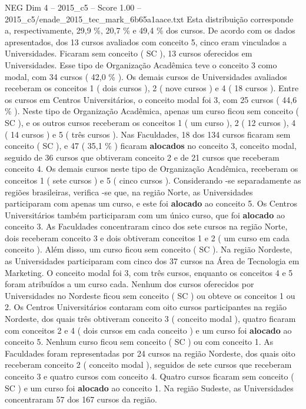 \begin{textsample}{NEG Dim 4 – 2015\_c5 – Score 1.00 – 2015\_c5/enade\_2015\_tec\_mark\_6b65a1aace.txt}
Esta distribuição corresponde a, respectivamente, 29,9 \%, 20,7 \% e 49,4 \% dos cursos.
De acordo com os dados apresentados, dos 13 cursos avaliados com conceito 5, cinco eram vinculados a Universidades.
Ficaram sem conceito ( SC ), 13 cursos oferecidos em Universidades.
Esse tipo de Organização Acadêmica teve o conceito 3 como modal, com 34 cursos ( 42,0 \% ).
Os demais cursos de Universidades avaliados receberam os conceitos 1 ( dois cursos ), 2 ( nove cursos ) e 4 ( 18 cursos ).
Entre os cursos em Centros Universitários, o conceito modal foi 3, com 25 cursos ( 44,6 \% ).
Neste tipo de Organização Acadêmica, apenas um curso ficou sem conceito ( SC ), e os outros cursos receberam os conceitos 1 ( um curso ), 2 ( 12 cursos ), 4 ( 14 cursos ) e 5 ( três cursos ).
Nas Faculdades, 18 dos 134 cursos ficaram sem conceito ( SC ), e 47 ( 35,1 \% ) ficaram \textbf{alocados} no conceito 3, conceito modal, seguido de 36 cursos que obtiveram conceito 2 e de 21 cursos que receberam conceito 4.
Os demais cursos neste tipo de Organização Acadêmica, receberam os conceitos 1 ( sete cursos ) e 5 ( cinco cursos ).
Considerando -se separadamente as regiões brasileiras, verifica -se que, na região Norte, as Universidades participaram com apenas um curso, e este foi \textbf{alocado} ao conceito 5.
Os Centros Universitários também participaram com um único curso, que foi \textbf{alocado} ao conceito 3.
As Faculdades concentraram cinco dos sete cursos na região Norte, dois receberam conceito 3 e dois obtiveram conceitos 1 e 2 ( um curso em cada conceito ).
Além disso, um curso ficou sem conceito ( SC ).
Na região Nordeste, as Universidades participaram com cinco dos 37 cursos na Área de Tecnologia em Marketing.
O conceito modal foi 3, com três cursos, enquanto os conceitos 4 e 5 foram atribuídos a um curso cada.
Nenhum dos cursos oferecidos por Universidades no Nordeste ficou sem conceito ( SC ) ou obteve os conceitos 1 ou 2.
Os Centros Universitários contaram com oito cursos participantes na região Nordeste, dos quais três obtiveram conceito 3 ( conceito modal ), quatro ficaram com conceitos 2 e 4 ( dois cursos em cada conceito ) e um curso foi \textbf{alocado} ao conceito 5.
Nenhum curso ficou sem conceito ( SC ) ou com conceito 1.
As Faculdades foram representadas por 24 cursos na região Nordeste, dos quais oito receberam conceito 2 ( conceito modal ), seguidos de sete cursos que receberam conceito 3 e quatro cursos com conceito 4.
Quatro cursos ficaram sem conceito ( SC ) e um curso foi \textbf{alocado} ao conceito 1.
Na região Sudeste, as Universidades concentraram 57 dos 167 cursos da região.

\end{textsample}
